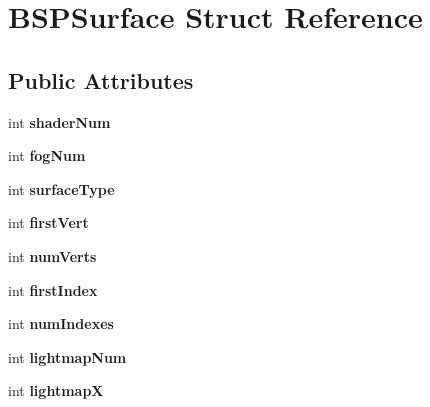 \hypertarget{struct_b_s_p_surface}{\section{B\+S\+P\+Surface Struct Reference}
\label{struct_b_s_p_surface}
}
\subsection*{Public Attributes}
\begin{DoxyCompactItemize}
\item 
\hypertarget{struct_b_s_p_surface_a7a7e6d5526a0b30a38357893fb2c4377}{int {\bfseries shader\+Num}}\label{struct_b_s_p_surface_a7a7e6d5526a0b30a38357893fb2c4377}

\item 
\hypertarget{struct_b_s_p_surface_a05c979a41d8d7e67338100f56cb57a1b}{int {\bfseries fog\+Num}}\label{struct_b_s_p_surface_a05c979a41d8d7e67338100f56cb57a1b}

\item 
\hypertarget{struct_b_s_p_surface_a76416b8b18cd4b1f13eb6505b125f101}{int {\bfseries surface\+Type}}\label{struct_b_s_p_surface_a76416b8b18cd4b1f13eb6505b125f101}

\item 
\hypertarget{struct_b_s_p_surface_a972f1ad3b7101efc4d9e3453234a5631}{int {\bfseries first\+Vert}}\label{struct_b_s_p_surface_a972f1ad3b7101efc4d9e3453234a5631}

\item 
\hypertarget{struct_b_s_p_surface_a5942ce7b07d64e4947071cec4c40f334}{int {\bfseries num\+Verts}}\label{struct_b_s_p_surface_a5942ce7b07d64e4947071cec4c40f334}

\item 
\hypertarget{struct_b_s_p_surface_ad53c221b9f268dc73221ad069e1580ce}{int {\bfseries first\+Index}}\label{struct_b_s_p_surface_ad53c221b9f268dc73221ad069e1580ce}

\item 
\hypertarget{struct_b_s_p_surface_aab911364cb3875dc9f984828497b1a0f}{int {\bfseries num\+Indexes}}\label{struct_b_s_p_surface_aab911364cb3875dc9f984828497b1a0f}

\item 
\hypertarget{struct_b_s_p_surface_a7b57ef73f16af427d5a055f0f424bcb3}{int {\bfseries lightmap\+Num}}\label{struct_b_s_p_surface_a7b57ef73f16af427d5a055f0f424bcb3}

\item 
\hypertarget{struct_b_s_p_surface_a82226da88cecdf2752a582fb4f5a18a5}{int {\bfseries lightmap\+X}}\label{struct_b_s_p_surface_a82226da88cecdf2752a582fb4f5a18a5}


\end{DoxyCompactItemize}
